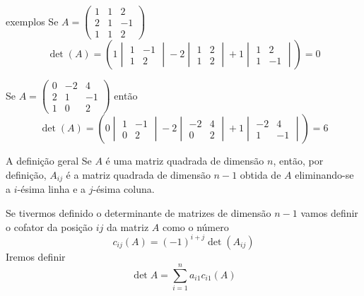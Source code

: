 \documentclass{beamer}
\begin{document}
\begin{frame}{exemplos}
  Se $A =\begin{pmatrix}
    1 & 1 & 2 \\ 2 & 1 & -1 \\ 1& 1 & 2
  \end{pmatrix}$ 
  $$ \det(A)= \left( 1
  \begin{vmatrix}
   1 & -1 \\
   1 &  2
 \end{vmatrix} -
  2
  \begin{vmatrix}
   1 & 2 \\
   1 & 2
 \end{vmatrix} + 1
 \begin{vmatrix}
   1 & 2\\
   1 & -1
 \end{vmatrix} \right)=0$$

 Se $A =\begin{pmatrix}
0 & -2 & 4 \\ 2 & 1 & -1  \\1 & 0 & 2
\end{pmatrix}$ então
$$ \det(A)=\left( 0
  \begin{vmatrix}
   1 & -1 \\
   0& 2
 \end{vmatrix} -
  2
  \begin{vmatrix}
   -2 & 4 \\ 0 & 2 
 \end{vmatrix} + 1
 \begin{vmatrix}
   -2 & 4\\
   1 & -1
 \end{vmatrix} \right)=6$$
\end{frame}

\begin{frame}{A definição geral}
  Se $A$ é uma matriz quadrada de dimensão $n$, então, por 
  definição, $A_{ij}$ é a matriz quadrada de dimensão $n-1$
  obtida de $A$ eliminando-se a $i$-ésima linha e a
  $j$-ésima coluna.

  Se tivermos definido o determinante de matrizes 
  de dimensão $n-1$ vamos definir o cofator da posição
  $ij$ da matriz $A$ como o número
  $$ c_{ij}(A)=(-1)^{i+j}\det(A_{ij}) $$
  Iremos definir
  $$ \det{A} = \sum_{i=1}^n a_{i1}c_{i1}(A)$$
  
\end{frame}
\end{document}
